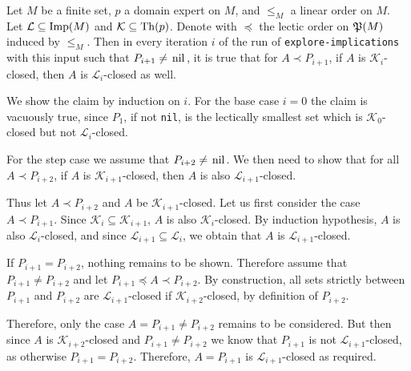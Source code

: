 \begin{Proposition}
  \label{prop:explore-implications-closedness-persists}
  Let $M$ be a finite set, $p$ a domain expert on $M$, and $\leq_M$ a linear order on
  $M$. Let $\mathcal{L} \subseteq \operatorname{Imp}(M)$ and $\mathcal{K} \subseteq \operatorname{Th}(p)$.  Denote
  with $\preceq$ the lectic order on ${\mathfrak{P}(M)}$ induced by $\leq_M$.  Then in every
  iteration $i$ of the run of \lstinline{explore-implications} with this input such that
  $P_{i+1} \neq \text{\lstinline{nil}}$, it is true that for $A \prec P_{i+1}$, if $A$ is
  $\mathcal{K}_i$-closed, then $A$ is $\mathcal{L}_i$-closed as well.
\end{Proposition}
\begin{Proof}
  We show the claim by induction on $i$.  For the base case $i = 0$ the claim is vacuously
  true, since $P_1$, if not \lstinline{nil}, is the lectically smallest set which is
  $\mathcal{K}_0$-closed but not $\mathcal{L}_i$-closed.

  For the step case we assume that $P_{i+2} \neq \text{\lstinline{nil}}$.  We then need to
  show that for all $A \prec P_{i+2}$, if $A$ is $\mathcal{K}_{i+1}$-closed, then $A$ is
  also $\mathcal{L}_{i+1}$-closed.

  Thus let $A \prec P_{i+2}$ and $A$ be $\mathcal{K}_{i+1}$-closed.  Let us first consider
  the case $A \prec P_{i+1}$.  Since $\mathcal{K}_i \subseteq \mathcal{K}_{i+1}$, $A$ is
  also $\mathcal{K}_i$-closed.  By induction hypothesis, $A$ is also
  $\mathcal{L}_i$-closed, and since $\mathcal{L}_{i+1} \subseteq \mathcal{L}_i$, we obtain
  that $A$ is $\mathcal{L}_{i+1}$-closed.

  If $P_{i+1} = P_{i+2}$, nothing remains to be shown.  Therefore assume that $P_{i+1}
  \neq P_{i+2}$ and let $P_{i+1} \preceq A \prec P_{i+2}$.  By construction, all sets
  strictly between $P_{i+1}$ and $P_{i+2}$ are $\mathcal{L}_{i+1}$-closed if
  $\mathcal{K}_{i+2}$-closed, by definition of $P_{i+2}$.

  Therefore, only the case $A = P_{i+1} \neq P_{i+2}$ remains to be considered.  But then
  since $A$ is $\mathcal{K}_{i+2}$-closed and $P_{i+1} \neq P_{i+2}$ we know that
  $P_{i+1}$ is not $\mathcal{L}_{i+1}$-closed, as otherwise $P_{i+1} = P_{i+2}$.
  Therefore, $A = P_{i+1}$ is $\mathcal{L}_{i+1}$-closed as required.
\end{Proof}

